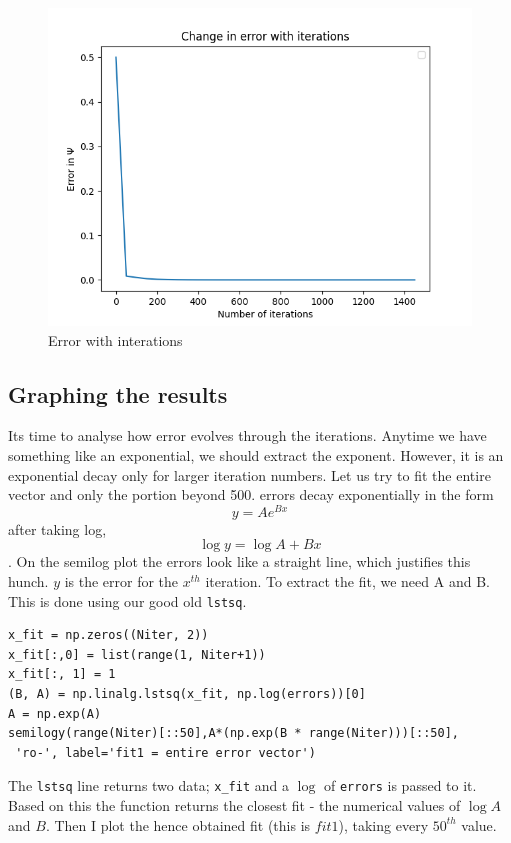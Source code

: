 \documentclass[11pt, a4paper]{article}
\begin{document}
\begin{figure}[!tbh]
   	\centering
  \includegraphics[scale=0.5]{Q2.png} 
    \caption{Error with interations}
   	\label{fig:error)}
   \end{figure}
   
\subsection{Graphing the results}
Its time to analyse how error evolves through the iterations. Anytime we have something like an exponential, we should extract the exponent. However,
it is an exponential decay only for larger iteration numbers. Let us try to fit the entire vector and only the
portion beyond 500. errors decay exponentially in the form 
$$y=Ae^{Bx}$$ after taking log, $$\log{y}=\log{A}+Bx$$. On the semilog plot the errors look like a straight line, which justifies this hunch. $y$ is the error for the $x^{th}$ iteration.  To extract the fit, we need A and B. This is done using our good old \texttt{lstsq}. 
\begin{verbatim}
x_fit = np.zeros((Niter, 2))
x_fit[:,0] = list(range(1, Niter+1))
x_fit[:, 1] = 1
(B, A) = np.linalg.lstsq(x_fit, np.log(errors))[0]
A = np.exp(A)
semilogy(range(Niter)[::50],A*(np.exp(B * range(Niter)))[::50],
 'ro-', label='fit1 = entire error vector')

\end{verbatim} 
The \texttt{lstsq} line returns two data; \texttt{x\_fit} and a $\log$ of \texttt{errors} is passed to it. Based on this the function returns the closest fit - the numerical values of $\log{A}$ and $B$.  Then I plot the hence obtained fit (this is $fit1$), taking every $50^{th}$ value. 
\end{document}
